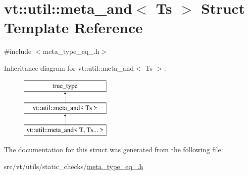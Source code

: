\hypertarget{structvt_1_1util_1_1meta__and}{}\section{vt\+:\+:util\+:\+:meta\+\_\+and$<$ Ts $>$ Struct Template Reference}
\label{structvt_1_1util_1_1meta__and}


{\ttfamily \#include $<$meta\+\_\+type\+\_\+eq\+\_\+.\+h$>$}

Inheritance diagram for vt\+:\+:util\+:\+:meta\+\_\+and$<$ Ts $>$\+:\begin{figure}[H]
\begin{center}
\leavevmode
\includegraphics[height=3.000000cm]{structvt_1_1util_1_1meta__and}
\end{center}
\end{figure}


The documentation for this struct was generated from the following file\+:\begin{DoxyCompactItemize}
\item 
src/vt/utils/static\+\_\+checks/\hyperlink{meta__type__eq___8h}{meta\+\_\+type\+\_\+eq\+\_\+.\+h}\end{DoxyCompactItemize}
